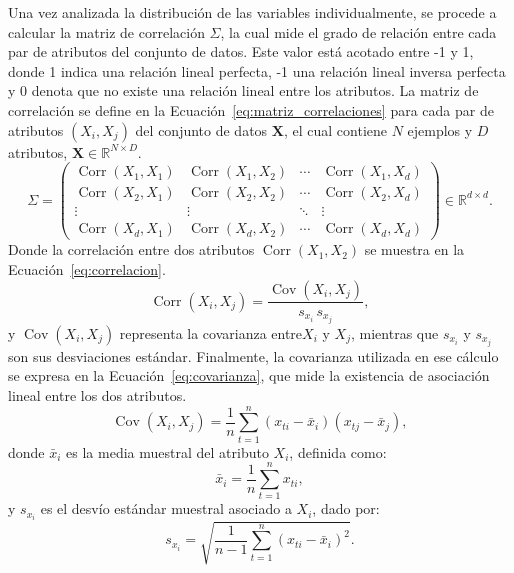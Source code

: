 \documentclass[a4paper,10pt]{book}
\begin{document}
Una vez analizada la distribución de las variables individualmente, se procede a calcular la matriz de correlación $\Sigma$, la cual mide el grado de relación entre cada par de atributos del conjunto de datos. Este valor está acotado entre -1 y 1, donde 1 indica una relación lineal perfecta, -1 una relación lineal inversa perfecta y 0 denota que no existe una relación lineal entre los atributos. La matriz de correlación se define en la Ecuación~\ref{eq:matriz_correlaciones} para cada par de atributos $(X_i, X_j)$ del conjunto de datos $\mathbf{X}$, el cual contiene $N$ ejemplos y $D$ atributos, $\mathbf{X} \in \mathbb{R}^{N \times D}$.
\begin{equation}
	\Sigma =
	\begin{pmatrix}
		\operatorname{Corr}(X_1, X_1) & \operatorname{Corr}(X_1, X_2) & \cdots & \operatorname{Corr}(X_1, X_d) \\
		\operatorname{Corr}(X_2, X_1) & \operatorname{Corr}(X_2, X_2) & \cdots & \operatorname{Corr}(X_2, X_d) \\
		\vdots & \vdots & \ddots & \vdots \\
		\operatorname{Corr}(X_d, X_1) & \operatorname{Corr}(X_d, X_2) & \cdots & \operatorname{Corr}(X_d, X_d)
	\end{pmatrix}
	\in \mathbb{R}^{d \times d}.
	\label{eq:matriz_correlaciones}
\end{equation}
Donde la correlación entre dos atributos $\operatorname{Corr}(X_1, X_2)$ se muestra en la Ecuación~\ref{eq:correlacion}.
\begin{equation}
	\operatorname{Corr}(X_i, X_j)
	=
	\frac{\operatorname{Cov}(X_i, X_j)}{s_{x_i}\, s_{x_j}},
	\label{eq:correlacion}
\end{equation}
y $\operatorname{Cov}(X_i, X_j)$ representa la covarianza entre$X_i$ y $X_j$, mientras que $s_{x_i}$ y $s_{x_j}$ son sus desviaciones estándar. Finalmente, la covarianza utilizada en ese cálculo se expresa en la Ecuación~\ref{eq:covarianza}, que mide la existencia de asociación lineal entre los dos atributos.
\begin{equation}
	\operatorname{Cov}(X_i, X_j) = \frac{1}{n} \sum_{t=1}^{n} (x_{ti} - \bar{x}_i)(x_{tj} - \bar{x}_j),
	\label{eq:covarianza}
\end{equation}
donde $\bar{x}_i$ es la media muestral del atributo $X_i$, definida como:
\begin{equation}
	\bar{x}_i = \frac{1}{n} \sum_{t=1}^{n} x_{ti},
	\label{eq:media_muestral}
\end{equation}
y $s_{x_i}$ es el desvío estándar muestral asociado a $X_i$, dado por:
\begin{equation}
	s_{x_i} = \sqrt{\frac{1}{n-1} \sum_{t=1}^{n} (x_{ti} - \bar{x}_i)^2}.
	\label{eq:desvio_muestral}
\end{equation}
\end{document}
